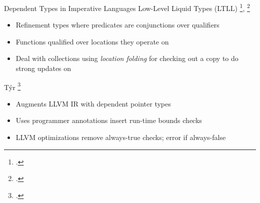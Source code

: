 \documentclass[aspectratio=169]{beamer}
\begin{document}
%
%
%


\begin{frame}{Dependent Types in Imperative Languages}
Low-Level Liquid Types (LTLL) \footcite{rondon_liquid_2008}, \footcite{rondon_low-level_2010}
\begin{itemize}
    \item Refinement types where predicates are conjunctions over qualifiers
    \item Functions qualified over locations they operate on
    \item Deal with collections using \emph{location folding} for checking out a copy to do strong updates on
\end{itemize}
T\'yr \footcite{de_araujo_tyr:_2016}
\begin{itemize}
    \item Augments LLVM IR with dependent pointer types
    \item Uses programmer annotations insert run-time bounds checks
    \item LLVM optimizations remove always-true checks; error if always-false
\end{itemize}
\vspace{0.2in}
\end{frame}
\end{document}
